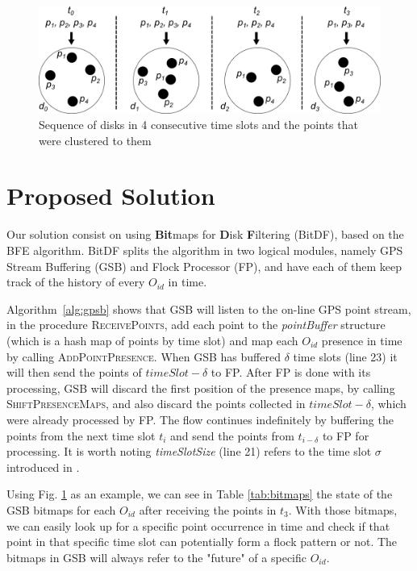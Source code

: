 \begin{figure}
    \centering
    \includegraphics[width=\linewidth]{images/disks_2.png}
    \caption{Sequence of disks in 4 consecutive time slots and the points that were clustered to them}
    \label{fig:disks}
\end{figure}

\section{Proposed Solution}
Our solution consist on using \textbf{Bit}maps for \textbf{D}isk \textbf{F}iltering (BitDF), based on the BFE algorithm.
BitDF splits the algorithm in two logical modules, namely GPS Stream Buffering (GSB) and Flock Processor (FP), and have
each of them keep track of the history of every $O_{id}$ in time.

Algorithm~\ref{alg:gpsb} shows that GSB will listen to the on-line GPS point stream, in the procedure
\textsc{ReceivePoints}, add each point to the \textit{pointBuffer} structure (which is a hash map of points by time
slot) and map each $O_{id}$ presence in time by calling \textsc{AddPointPresence}. When GSB has buffered $\delta$ time
slots (line 23) it will then send the points of $timeSlot - \delta$ to FP. After FP is done with its processing, GSB
will discard the first position of the presence maps, by calling \textsc{ShiftPresenceMaps}, and also discard the points
collected in $timeSlot - \delta$, which were already processed by FP. The flow continues indefinitely by buffering the
points from the next time slot $t_i$ and send the points from $t_{i - \delta}$ to FP for processing. It is worth noting
\textit{timeSlotSize} (line 21) refers to the time slot $\sigma$ introduced in .

Using Fig. \ref{fig:disks} as an example, we can see in Table \ref{tab:bitmaps} the state of the GSB bitmaps for each
$O_{id}$ after receiving the points in $t_3$. With those bitmaps, we can easily look up for a specific point occurrence
in time and check if that point in that specific time slot can potentially form a flock pattern or not. The bitmaps in
GSB will always refer to the "future" of a specific $O_{id}$.

